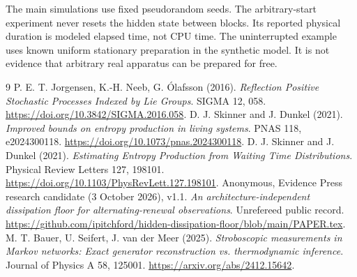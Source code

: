 \documentclass[11pt,a4paper]{article}
\begin{document}
The main simulations use fixed pseudorandom seeds. The arbitrary-start experiment never resets the hidden state between blocks. Its reported physical duration is modeled elapsed time, not CPU time. The uninterrupted example uses known uniform stationary preparation in the synthetic model. It is not evidence that arbitrary real apparatus can be prepared for free.

\begin{thebibliography}{9}
 P. E. T. Jorgensen, K.-H. Neeb, G. \'Olafsson (2016).
\emph{Reflection Positive Stochastic Processes Indexed by Lie Groups}.
SIGMA 12, 058. \url{https://doi.org/10.3842/SIGMA.2016.058}.
 D. J. Skinner and J. Dunkel (2021).
\emph{Improved bounds on entropy production in living systems}.
PNAS 118, e2024300118. \url{https://doi.org/10.1073/pnas.2024300118}.
 D. J. Skinner and J. Dunkel (2021).
\emph{Estimating Entropy Production from Waiting Time Distributions}.
Physical Review Letters 127, 198101. \url{https://doi.org/10.1103/PhysRevLett.127.198101}.
 Anonymous, Evidence Press research candidate (3 October 2026), v1.1.
\emph{An architecture-independent dissipation floor for alternating-renewal observations}.
Unrefereed public record. \url{https://github.com/ipitchford/hidden-dissipation-floor/blob/main/PAPER.tex}.
 M. T. Bauer, U. Seifert, J. van der Meer (2025).
\emph{Stroboscopic measurements in Markov networks: Exact generator reconstruction vs. thermodynamic inference}.
Journal of Physics A 58, 125001. \url{https://arxiv.org/abs/2412.15642}.
\end{thebibliography}
\end{document}
